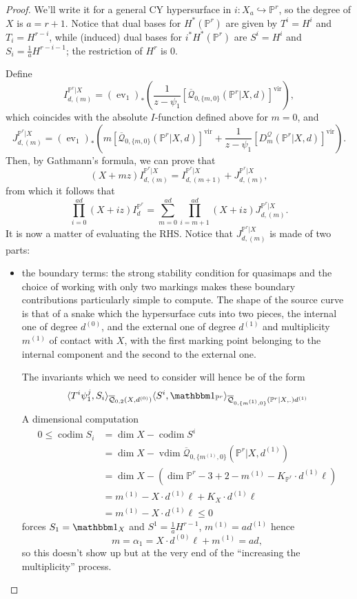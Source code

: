 \documentclass[11pt]{amsart}
\newcommand{\Q}[4]{\overline{\mathcal Q}_{#1,#2}(#3,#4)}
\newcommand{\PP}{\mathbb P}
\newcommand{\ev}{\operatorname{ev}}
\newcommand{\codim}{\operatorname{codim}}
\newcommand{\vdim}{\operatorname{vdim}}
\theoremstyle{plain}
\theoremstyle{definition}
\begin{document}
\begin{proof}
 We'll write it for a general CY hypersurface in $i\colon X_a\hookrightarrow\PP^r$, so the degree of $X$ is $a=r+1$. Notice that dual bases for $H^*(\PP^r)$ are given by $T^i=H^i$ and $T_i=H^{r-i}$, while (induced) dual bases for $i^*H^*(\PP^r)$ are $S^i=H^i$ and $S_i=\frac{1}{a}H^{r-i-1}$; the restriction of $H^r$ is 0.
 
 Define
 \[
  I^{\PP^r|X}_{d,(m)}=(\ev_1)_*\left(\frac{1}{z-\psi_1}[\Q{0}{\{m,0\}}{\PP^r|X}{d}]^\text{vir}\right),
 \]
which coincides with the absolute $I$-function defined above for $m=0$, and
\[
 J^{\PP^r|X}_{d,(m)}=(\ev_1)_*\left(m[\Q{0}{\{m,0\}}{\PP^r|X}{d}]^\text{vir}+\frac{1}{z-\psi_1}[D_m^{\mathcal Q}(\PP^r|X,d)]^\text{vir}\right).
\]
Then, by Gathmann's formula, we can prove that
\begin{equation}\label{eqn:G}
 (X+mz) I^{\PP^r|X}_{d,(m)}= I^{\PP^r|X}_{d,(m+1)}+ J^{\PP^r|X}_{d,(m)},
\end{equation}
from which it follows that
\[
 \prod_{i=0}^{ad}(X+iz) I^{\PP^r}_d=\sum_{m=0}^{ad}\prod_{i=m+1}^{ad}(X+iz)J^{\PP^r|X}_{d,(m)}.
\]
It is now a matter of evaluating the RHS. Notice that $J^{\PP^r|X}_{d,(m)}$ is made of two parts:
\begin{itemize}
 \item the boundary terms: the strong stability condition for quasimaps and the choice of working with only two markings makes these boundary contributions particularly simple to compute. The shape of the source curve is that of a snake which the hypersurface cuts into two pieces, the internal one of degree $d^{(0)}$, and the external one of degree $d^{(1)}$ and multiplicity $m^{(1)}$ of contact with $X$, with the first marking point belonging to the internal component and the second to the external one.
 
 The invariants which we need to consider will hence be of the form
 \[
  \langle T^i\psi_1^j,S_i\rangle_{\Q{0}{2}{X}{d^{(0)}}}\langle S^i,\mathbbm 1_{\PP^r}\rangle_{\Q{0}{\{m^{(1)},0\}}{\PP^r|X}.{d^{(1)}}}
 \]
 A dimensional computation
\begin{align*}
 0\leq \codim S_i &= \dim X-\codim S^i \\
 &= \dim X-\vdim \Q{0}{\{m^{(1)},0\}}{\PP^r|X}{d^{(1)}} \\
 &= \dim X-(\dim\PP^r-3+2-m^{(1)}-K_{\PP^r}\cdot d^{(1)}\ell)\\
 &= m^{(1)}-X\cdot d^{(1)}\ell+K_{X}\cdot d^{(1)}\ell \\
 &= m^{(1)}-X\cdot d^{(1)}\ell\leq 0
\end{align*}
forces $S_1=\mathbbm 1_X$ and $S^1=\frac{1}{a}H^{r-1}$, $m^{(1)}=ad^{(1)}$ hence
\[
 m=\alpha_1=X\cdot d^{(0)}\ell+m^{(1)}=ad,
\]
so this doesn't show up but at the very end of the ``increasing the multiplicity'' process.


\end{itemize}
\end{proof}
\end{document}
